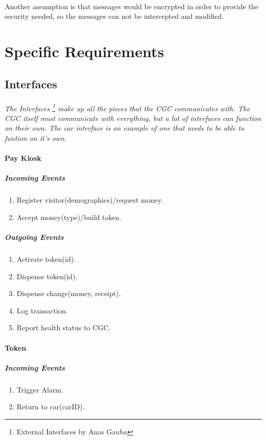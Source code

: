 \documentclass[12pt]{article}
\begin{document}
		\paragraph{} Another assumption is that messages would be encrypted in order 
		to provide the security needed, so the messages can not be intercepted and 
		modified.

\section{Specific Requirements} \label{spec} %
	\subsection{Interfaces} \label{inter}%
		\paragraph{} \textit{The Interfaces \footnote{External Interfaces by Anas Gauba} 
		make up all the pieces that the CGC communicates with. The CGC itself must communicate with everything, 
		but a lot of interfaces can function on their own. The car interface is an example of one that needs to be able to funtion on it's own.}
		
		\paragraph{Pay Kiosk}
		\textit{}
			\subparagraph{Incoming Events}
				\begin{enumerate}
					\item Register visitor(demographics)/request money.
                    \item Accept money(type)/build token. 
				\end{enumerate}
				
			\subparagraph{Outgoing Events}
				\begin{enumerate}
					\item Activate token(id).
                    \item Dispense token(id). 
                    \item Dispense change(money, receipt).
                    \item Log transaction. 
                    \item Report health status to CGC. 
				\end{enumerate}

		\paragraph{Token}
		\textit{}
			\subparagraph{Incoming Events}
				\begin{enumerate}
					\item Trigger Alarm. 
                    \item Return to car(carID). 
				\end{enumerate}
				
\end{document}
